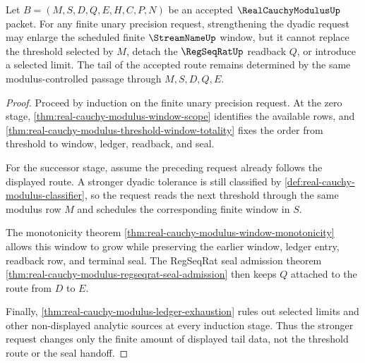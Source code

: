 \begin{theorem}
\label{thm:real-cauchy-modulus-tail-threshold-determinacy}
Let $B=(M,S,D,Q,E,H,C,P,N)$ be an accepted $\RealCauchyModulusUp$ packet. For any finite unary precision request, strengthening the dyadic request may enlarge the scheduled finite $\StreamNameUp$ window, but it cannot replace the threshold selected by $M$, detach the $\RegSeqRatUp$ readback $Q$, or introduce a selected limit. The tail of the accepted route remains determined by the same modulus-controlled passage through $M,S,D,Q,E$.
\end{theorem}
\begin{proof}
Proceed by induction on the finite unary precision request. At the zero stage, \autoref{thm:real-cauchy-modulus-window-scope} identifies the available rows, and \autoref{thm:real-cauchy-modulus-threshold-window-totality} fixes the order from threshold to window, ledger, readback, and seal.

For the successor stage, assume the preceding request already follows the displayed route. A stronger dyadic tolerance is still classified by \autoref{def:real-cauchy-modulus-classifier}, so the request reads the next threshold through the same modulus row $M$ and schedules the corresponding finite window in $S$.

The monotonicity theorem \autoref{thm:real-cauchy-modulus-window-monotonicity} allows this window to grow while preserving the earlier window, ledger entry, readback row, and terminal seal. The RegSeqRat seal admission theorem \autoref{thm:real-cauchy-modulus-regseqrat-seal-admission} then keeps $Q$ attached to the route from $D$ to $E$.

Finally, \autoref{thm:real-cauchy-modulus-ledger-exhaustion} rules out selected limits and other non-displayed analytic sources at every induction stage. Thus the stronger request changes only the finite amount of displayed tail data, not the threshold route or the seal handoff.
\end{proof}

